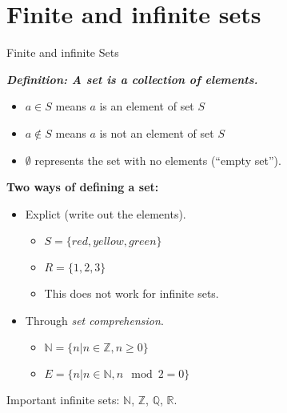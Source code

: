 \documentclass[style=sailor,size=12pt]{powerdot}
\newcommand{\bb}[1]{\mathbb{#1}}
\newcommand{\Z}{\bb{Z}}
\newcommand{\Q}{\bb{Q}}
\newcommand{\R}{\bb{R}}
\newcommand{\N}{\bb{N}}
\begin{document}
\section[slide=false]{Finite and infinite sets}
\begin{slide}[bm=,toc=]{Finite and infinite Sets}

\emph{\textbf{Definition: A set is a collection of elements.}}
\begin{itemize}
\item $a \in S$ means $a$ is an element of set $S$ 
\item $a \notin S$ means $a$ is not an element of set $S$
\item $\emptyset$ represents the set with no elements (``empty set'').
\end{itemize} 

\textbf{Two ways of defining a set:}
\begin{itemize}
\item Explict (write out the elements).
   \begin{itemize}
   \item $S = \{red, yellow, green\}$ 
   \item $R = \{1,2,3\}$
   \item This does not work for infinite sets.
   \end{itemize} 
\item Through \emph{set comprehension}. 
   \begin{itemize}
   \item $\N = \{n| n \in \Z, n \geq 0\}$ 
   \item $E = \{n| n \in \N, n \mod{2} = 0 \}$
   \end{itemize}
\end{itemize} 

Important infinite sets: $\N$, $\Z$, $\Q$, $\R$.

\end{slide}
\end{document}
